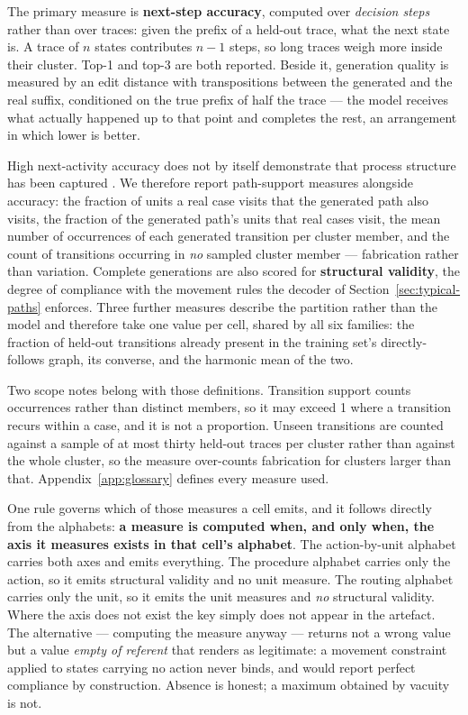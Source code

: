The primary measure is \textbf{next-step accuracy}, computed over \emph{decision steps} rather
than over traces: given the prefix of a held-out trace, what the next state is. A trace of $n$
states contributes $n-1$ steps, so long traces weigh more inside their cluster. Top-1 and top-3
are both reported. Beside it, generation quality is measured by an edit distance with
transpositions between the generated and the real suffix, conditioned on the true prefix of half
the trace --- the model receives what actually happened up to that point and completes the rest,
an arrangement in which lower is better.

High next-activity accuracy does not by itself demonstrate that process structure has been
captured \citep{peeperkorn2023rnnstructure}. We therefore report path-support measures alongside
accuracy: the fraction of units a real case visits that the generated path also visits, the
fraction of the generated path's units that real cases visit, the mean number of occurrences of
each generated transition per cluster member, and the count of transitions occurring in
\emph{no} sampled cluster member --- fabrication rather than variation. Complete generations are
also scored for \textbf{structural validity}, the degree of compliance with the movement rules the
decoder of Section~\ref{sec:typical-paths} enforces. Three further measures describe the partition
rather than the model and therefore take one value per cell, shared by all six families: the
fraction of held-out transitions already present in the training set's directly-follows graph, its
converse, and the harmonic mean of the two.

Two scope notes belong with those definitions. Transition support counts occurrences rather than
distinct members, so it may exceed 1 where a transition recurs within a case, and it is not a
proportion. Unseen transitions are counted against a sample of at most thirty held-out traces per
cluster rather than against the whole cluster, so the measure over-counts fabrication for clusters
larger than that. Appendix~\ref{app:glossary} defines every measure used.

One rule governs which of those measures a cell emits, and it follows directly from the alphabets:
\textbf{a measure is computed when, and only when, the axis it measures exists in that cell's
alphabet}. The action-by-unit alphabet carries both axes and emits everything. The procedure
alphabet carries only the action, so it emits structural validity and no unit measure. The routing
alphabet carries only the unit, so it emits the unit measures and \emph{no} structural validity.
Where the axis does not exist the key simply does not appear in the artefact. The alternative ---
computing the measure anyway --- returns not a wrong value but a value \emph{empty of referent}
that renders as legitimate: a movement constraint applied to states carrying no action never
binds, and would report perfect compliance by construction. Absence is honest; a maximum obtained
by vacuity is not.


